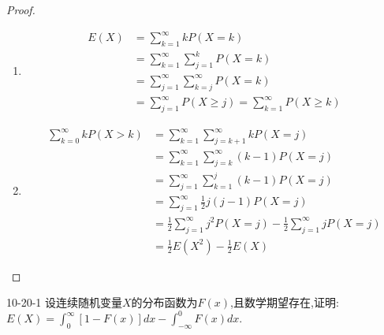 \documentclass[../main.tex]{subfiles}
\begin{document}
 \begin{proof}
    \begin{enumerate}
        \item  \[
        \begin{aligned}
        E\left( X \right)&= \sum _{k= 1}^{\infty}k P\left( X= k \right)  \\ 
         &= \sum _{k= 1}^{\infty}\sum _{j= 1}^{k}P\left( X= k \right)\\ 
          &= \sum _{j= 1}^{\infty}\sum _{k= j}^{\infty}P\left( X= k \right) \\ 
           &= \sum _{j= 1}^{\infty}P\left( X\ge j \right)= \sum _{k= 1}^{\infty}P\left( X\ge k \right)  
        \end{aligned} 
        \] 
        \item  \[
       \begin{aligned}
       \sum _{k= 0}^{\infty}kP\left( X> k \right)&=\sum _{k= 1}^{\infty}\sum _{j= k+ 1}^{\infty}kP\left( X= j \right)\\ 
        &=   \sum _{k= 1}^{\infty}\sum _{j= k}^{\infty}\left( k-1 \right) P\left( X= j \right) \\ 
        &= \sum _{j= 1}^{\infty}\sum _{k= 1}^{j}\left( k-1 \right)P\left( X= j \right)\\ 
         &=   \sum _{j= 1}^{\infty} \frac{1 }{2 }j\left( j-1 \right)P\left( X= j \right)   \\ 
          &= \frac{1}{2}\sum _{j= 1}^{\infty}j^{2}P\left( X= j \right)-\frac{1 }{2 }\sum _{j= 1}^{\infty}jP\left( X= j \right)\\ 
           &= \frac{1}{2}E\left( X^{2} \right)-\frac{1}{2}E\left( X \right)     
       \end{aligned}
        \]
    \end{enumerate}
    
 \end{proof}
 \begin{exercise}{}{10-20-1}
    设连续随机变量$X$的分布函数为$F(x)$,且数学期望存在,证明:
$E(X) = \int_{0}^{\infty} [1 - F(x)] dx - \int_{-\infty}^{0} F(x) dx.$
 \end{exercise}
\end{document}
